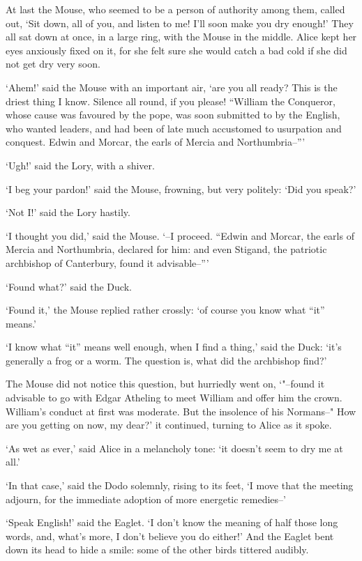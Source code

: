 \documentclass[statementpaper,twoside,openany]{memoir}
\begin{document}
At last the Mouse, who seemed to be a person of authority among them, called out, `Sit down, all of you, and listen to me! I'll soon make you dry enough!' They all sat down at once, in a large ring, with the Mouse in the middle. Alice kept her eyes anxiously fixed on it, for she felt sure she would catch a bad cold if she did not get dry very soon.

`Ahem!' said the Mouse with an important air, `are you all ready? This is the driest thing I know. Silence all round, if you please! ``William the Conqueror, whose cause was favoured by the pope, was soon submitted to by the English, who wanted leaders, and had been of late much accustomed to usurpation and conquest. Edwin and Morcar, the earls of Mercia and Northumbria--'''

`Ugh!' said the Lory, with a shiver.

`I beg your pardon!' said the Mouse, frowning, but very politely: `Did you speak?'

`Not I!' said the Lory hastily.

`I thought you did,' said the Mouse. `--I proceed. ``Edwin and Morcar, the earls of Mercia and Northumbria, declared for him: and even Stigand, the patriotic archbishop of Canterbury, found it advisable--'''

`Found what?' said the Duck.

`Found it,' the Mouse replied rather crossly: `of course you know what ``it'' means.'

`I know what ``it'' means well enough, when I find a thing,' said the Duck: `it's generally a frog or a worm. The question is, what did the archbishop find?'

The Mouse did not notice this question, but hurriedly went on, `"--found it advisable to go with Edgar Atheling to meet William and offer him the crown. William's conduct at first was moderate. But the insolence of his Normans--" How are you getting on now, my dear?' it continued, turning to Alice as it spoke.

`As wet as ever,' said Alice in a melancholy tone: `it doesn't seem to dry me at all.'

`In that case,' said the Dodo solemnly, rising to its feet, `I move that the meeting adjourn, for the immediate adoption of more energetic remedies--'

`Speak English!' said the Eaglet. `I don't know the meaning of half those long words, and, what's more, I don't believe you do either!' And the Eaglet bent down its head to hide a smile: some of the other birds tittered audibly.
\end{document}

